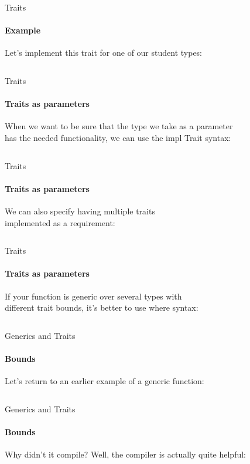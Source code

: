 \documentclass[usenames,dvipsnames,10pt,aspectratio=169]{beamer}
\begin{document}
\begin{frame}{Traits}
	\framesubtitle{Example}
	\large
	Let's implement this trait for one of our student types:\\
	\vspace{0.2cm}
	\inputminted[fontsize=\normalsize]{rust}{code/traits2.rs}
\end{frame}

\begin{frame}{Traits}
	\framesubtitle{Traits as parameters}
	\large
	When we want to be sure that the type we take as a parameter\\
	has the needed functionality, we can use the \textcolor{ucuyellow}{impl Trait} syntax:\\
	\vspace{0.2cm}
	\inputminted[fontsize=\large]{rust}{code/traits3.rs}
\end{frame}

\begin{frame}{Traits}
	\framesubtitle{Traits as parameters}
	\large
	We can also specify having multiple traits\\
	implemented as a requirement:\\
	\vspace{0.2cm}
	\inputminted[fontsize=\large]{rust}{code/traits4.rs}
\end{frame}

\begin{frame}{Traits}
	\framesubtitle{Traits as parameters}
	\large
	If your function is generic over several types with\\
	different trait bounds, it's better to use \textcolor{ucuyellow}{where} syntax:\\	
	\vspace{0.2cm}
	\inputminted[fontsize=\large]{rust}{code/traits5.rs}
\end{frame}

\begin{frame}{Generics and Traits}
	\framesubtitle{Bounds}
	\large
	Let's return to an earlier example of a generic function:
	\vspace{0.2cm}
	\inputminted[fontsize=\Large]{rust}{code/generics5.rs}
	\vspace{0.2cm}
\end{frame}

\begin{frame}{Generics and Traits}
	\framesubtitle{Bounds}
	Why didn't it compile? Well, the compiler is actually quite helpful:\\
	\vspace{0.2cm}
	\inputminted[fontsize=\large]{rust}{code/generics6.rs}
\end{frame}
\end{document}
